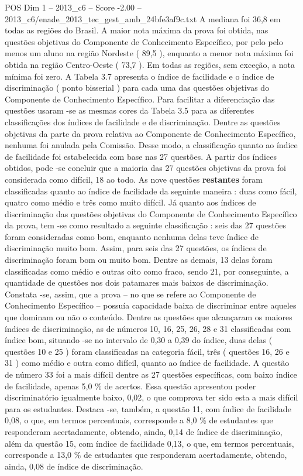 \begin{textsample}{POS Dim 1 – 2013\_c6 – Score -2.00 – 2013\_c6/enade\_2013\_tec\_gest\_amb\_24bfe3af9c.txt}
A mediana foi 36,8 em todas as regiões do Brasil.
A maior nota máxima da prova foi obtida, nas questões objetivas do Componente de Conhecimento Específico, por pelo pelo menos um aluno na região Nordeste ( 89,5 ), enquanto a menor nota máxima foi obtida na região Centro-Oeste ( 73,7 ).
Em todas as regiões, sem exceção, a nota mínima foi zero.
A Tabela 3.7 apresenta o índice de facilidade e o índice de discriminação ( ponto bisserial ) para cada uma das questões objetivas do Componente de Conhecimento Específico.
Para facilitar a diferenciação das questões usaram -se as mesmas cores da Tabela 3.5 para as diferentes classificações dos índices de facilidade e de discriminação.
Dentre as questões objetivas da parte da prova relativa ao Componente de Conhecimento Específico, nenhuma foi anulada pela Comissão.
Desse modo, a classificação quanto ao índice de facilidade foi estabelecida com base nas 27 questões.
A partir dos índices obtidos, pode -se concluir que a maioria das 27 questões objetivas da prova foi considerada como difícil, 18 ao todo.
As nove questões \textbf{restantes} foram classificadas quanto ao índice de facilidade da seguinte maneira : duas como fácil, quatro como médio e três como muito difícil.
Já quanto aos índices de discriminação das questões objetivas do Componente de Conhecimento Específico da prova, tem -se como resultado a seguinte classificação : seis das 27 questões foram consideradas como bom, enquanto nenhuma delas teve índice de discriminação muito bom.
Assim, para seis das 27 questões, os índices de discriminação foram bom ou muito bom.
Dentre as demais, 13 delas foram classificadas como médio e outras oito como fraco, sendo 21, por conseguinte, a quantidade de questões nos dois patamares mais baixos de discriminação.
Constata -se, assim, que a prova – no que se refere ao Componente de Conhecimento Específico – possuía capacidade baixa de discriminar entre aqueles que dominam ou não o conteúdo.
Dentre as questões que alcançaram os maiores índices de discriminação, as de números 10, 16, 25, 26, 28 e 31 classificadas com índice bom, situando -se no intervalo de 0,30 a 0,39 do índice, duas delas ( questões 10 e 25 ) foram classificadas na categoria fácil, três ( questões 16, 26 e 31 ) como médio e outra como difícil, quanto ao índice de facilidade.
A questão de número 33 foi a mais difícil dentre as 27 questões específicas, com baixo índice de facilidade, apenas 5,0 \% de acertos.
Essa questão apresentou poder discriminatório igualmente baixo, 0,02, o que comprova ter sido esta a mais difícil para os estudantes.
Destaca -se, também, a questão 11, com índice de facilidade 0,08, o que, em termos percentuais, corresponde a 8,0 \% de estudantes que responderam acertadamente, obtendo, ainda, 0,14 de índice de discriminação, além da questão 15, com índice de facilidade 0,13, o que, em termos percentuais, corresponde a 13,0 \% de estudantes que responderam acertadamente, obtendo, ainda, 0,08 de índice de discriminação.

\end{textsample}
